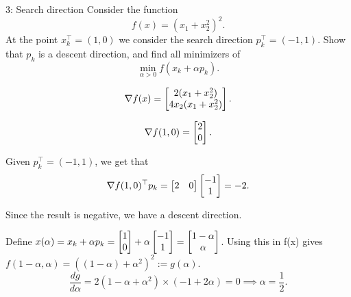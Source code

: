 
\begin{problem}{3: Search direction}
Consider the function 
\[
  f(x) = (x_1+x_2^2)^2
.\] 
At the point $x_k^{\top} = (1, 0)$ we consider the search direction $p_k^{\top} = (-1, 1)$. Show that $p_k$ is a descent direction, and find all minimizers of 
\[
  \min_{\alpha > 0} f(x_k + \alpha p_k)
.\] 
\end{problem}


\[
  \nabla f(x) = \begin{bmatrix} 2(x_1+x_2^2) \\ 4x_2(x_1+x_2^2) \end{bmatrix}
.\] 

\[
  \nabla f(1, 0) = \begin{bmatrix} 2 \\ 0 \end{bmatrix}
.\] 

Given $p_k^{\top} = (-1, 1)$, we get that
\[
  \nabla f(1, 0) ^{\top}p_k = \begin{bmatrix} 2  & 0 \end{bmatrix}\begin{bmatrix} -1 \\ 1 \end{bmatrix} = -2
.\] 

Since the result is negative, we have a descent direction. 


\medskip Define $x(\alpha) = x_k + \alpha p_k = \begin{bmatrix} 1 \\ 0 \end{bmatrix} + \alpha \begin{bmatrix} -1 \\ 1 \end{bmatrix} = \begin{bmatrix} 1 - \alpha \\ \alpha \end{bmatrix}$. Using this in f(x) gives $f(1-\alpha, \alpha) = ((1- \alpha) + \alpha^2)^2 := g(\alpha)$.
\[
  \frac{dg}{d\alpha} = 2(1-\alpha + \alpha^2) \times (-1+ 2\alpha) = 0 \implies \alpha = \frac{1}{2}
.\] 
